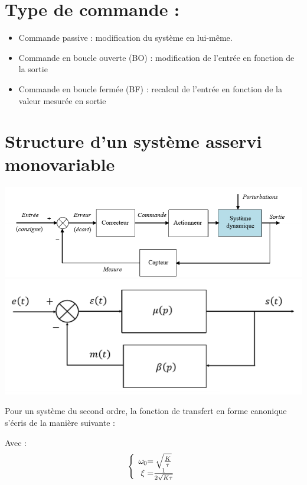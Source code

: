 \section{Type de commande :}
\begin{itemize}
    \item Commande passive : modification du système en lui-même.
    \item Commande en boucle ouverte (BO) : modification de l'entrée en fonction de la sortie
    \item Commande en boucle fermée (BF) : recalcul de l'entrée en fonction de la valeur mesurée en sortie
\end{itemize}
\section{Structure d'un système asservi monovariable}
\begin{center}
    \includegraphics[scale=0.8]{Pics/FTBF.png}
    \includegraphics[scale=0.8]{Pics/assev2ndOrdre.png}
\end{center}

Pour un système du second ordre, la fonction de transfert en forme canonique s'écris de la manière suivante : 
\begin{center}
    \Large{} 
\end{center}
\newpage
Avec :
\large{
    \[
\left \{
\begin{array}{c @{=} c}
    \omega_{0} & \sqrt{\frac{K}{\tau}}\\
    \xi & \frac{1}{2\sqrt{K\tau}}
\end{array}
\right.
\]
}
\newline


